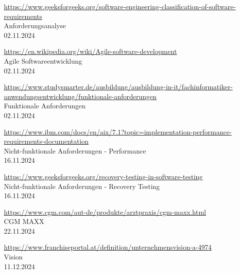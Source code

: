 \begin{thebibliography}{999}
    \clearpage

    \href{https://www.geeksforgeeks.org/software-engineering-classification-of-software-requirements}{https://www.geeksforgeeks.org/software-engineering-classification-of-software-requirements} \\
    Anforderungsanalyse \\
    02.11.2024

    \href{https://en.wikipedia.org/wiki/Agile_software_development}{https://en.wikipedia.org/wiki/Agile-software-development} \\
    Agile Softwareentwicklung \\
    02.11.2024

    \href{https://www.studysmarter.de/ausbildung/ausbildung-in-it/fachinformatiker-anwendungsentwicklung/funktionale-anforderungen}{https://www.studysmarter.de/ausbildung/ausbildung-in-it/fachinformatiker-anwendungsentwicklung/funktionale-anforderungen} \\
    Funktionale Anforderungen \\
    02.11.2024 

    \href{https://www.ibm.com/docs/en/aix/7.1?topic=implementation-performance-requirements-documentation}{https://www.ibm.com/docs/en/aix/7.1?topic=implementation-performance-requirements-documentation} \\
    Nicht-funktionale Anforderungen - Performance \\
    16.11.2024

    \href{https://www.geeksforgeeks.org/recovery-testing-in-software-testing}{https://www.geeksforgeeks.org/recovery-testing-in-software-testing} \\
    Nicht-funktionale Anforderungen - Recovery Testing \\
    16.11.2024

    \href{https://www.cgm.com/aut_de/produkte/arztpraxis/cgm-maxx.html}{https://www.cgm.com/aut-de/produkte/arztpraxis/cgm-maxx.html} \\
    CGM MAXX \\
    22.11.2024

    \href{https://www.franchiseportal.at/definition/unternehmensvision-a-4974}{https://www.franchiseportal.at/definition/unternehmensvision-a-4974} \\
    Vision \\
    11.12.2024 \\


\end{thebibliography}
